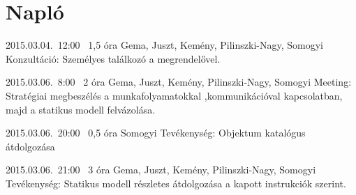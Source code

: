%
\section{Napló}

\begin{naplo}
	
\bejegyzes
{2015.03.04.~12:00~} %
{1,5 óra} %
{Gema, Juszt, Kemény, Pilinszki-Nagy, Somogyi} %
{Konzultáció: Személyes találkozó a megrendelővel.} %

\bejegyzes
{2015.03.06.~8:00~} %
{2 óra} %
{Gema, Juszt, Kemény, Pilinszki-Nagy, Somogyi} %
{Meeting: Stratégiai megbeszélés a munkafolyamatokkal ,kommunikációval kapcsolatban, majd a statikus modell felvázolása.} %

\bejegyzes
{2015.03.06.~20:00~} %
{0,5 óra} %
{Somogyi} %
{Tevékenység: Objektum katalógus átdolgozása} %

\bejegyzes
{2015.03.06.~21:00~}
{3 óra}
{Gema, Juszt, Kemény, Pilinszki-Nagy, Somogyi}
{Tevékenység: Statikus modell részletes átdolgozása a kapott instrukciók szerint.}




\end{naplo}

